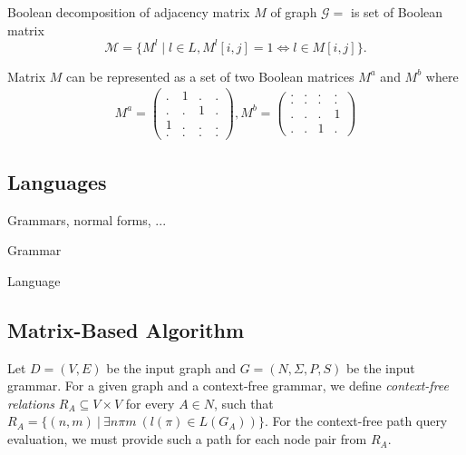 \begin{definition}

Boolean decomposition of adjacency matrix $M$ of graph $\mathcal{G}=$ is set of Boolean matrix $$\mathcal{M} = \{M^l \mid l \in L, M^l[i,j]=1 \iff l \in M[i,j]\}.$$

\end{definition}

Matrix $M$ can be represented as a set of two Boolean matrices $M^a$ and $M^b$ where
\begin{align}
M^{a} =
\begin{pmatrix}
    . & 1 & . & .   \\
    . & . & 1 & .   \\
    1 & . & . & .   \\
    . & . & . & .  
\end{pmatrix}, 
M^{b} =
\begin{pmatrix}      
    . & . & . & .   \\
    . & . & . & .   \\
    . & . & . & 1   \\
    . & . & 1 & . 
\end{pmatrix} \label{eq:boolean_decomposition_of_graph}
\end{align}
\subsection{Languages}

Grammars, normal forms, ...
\begin{definition}
Grammar
\end{definition}

\begin{definition}
Language
\end{definition}


\subsection{Matrix-Based Algorithm}

Let $D = (V, E)$ be the input graph and $G = (N, \Sigma, P, S)$ be the input grammar. For a given graph and a context-free grammar, we define \emph{context-free relations} \mbox{$R_A \subseteq V \times V$} for every \mbox{$A \in N$}, such that $R_A = \{(n,m)~|~\exists n \pi m~(l(\pi) \in L(G_A))\}$. For the context-free path query evaluation, we must provide such a path for each node pair from $R_A$.

